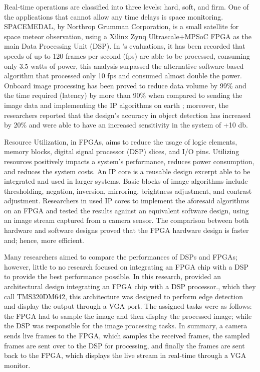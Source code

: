 \par	Real-time operations are classified into three levels: hard, soft, and firm. One of the applications that cannot allow any time delays is space monitoring. SPACEMEDAL, by Northrop Grumman Corporation, is a small satellite for space meteor observation, using a Xilinx Zynq Ultrascale+MPSoC FPGA as the main Data Processing Unit (DSP). In \cite{eleven}’s evaluations, it has been recorded that speeds of up to 120 frames per second (fps) are able to be processed, consuming only 3.5 watts of power, this analysis surpassed the alternative software-based algorithm that processed only 10 fps and consumed almost double the power. Onboard image processing has been proved to reduce data volume by 99\% and the time required (latency) by more than 90\% when compared to sending the image data and implementing the IP algorithms on earth \cite{eleven}; moreover, the researchers reported that the design’s accuracy in object detection has increased by 20\% and were able to have an increased sensitivity in the system of +10 db.   \newline
\par	Resource Utilization, in FPGAs, aims to reduce the usage of logic elements, memory blocks, digital signal processor (DSP) slices, and I/O pins. Utilizing resources positively impacts a system’s performance, reduces power consumption, and reduces the system costs. An IP core is a reusable design excerpt able to be integrated and used in larger systems. Basic blocks of image algorithms include thresholding, negation, inversion, mirroring, brightness adjustment, and contrast adjustment. Researchers in \cite{fourteen} used IP cores to implement the aforesaid algorithms on an FPGA and tested the results against an equivalent software design, using an image stream captured from a camera sensor. The comparison between both hardware and software designs proved that the FPGA hardware design is faster and; hence, more efficient. \newline
\par	Many researchers aimed to compare the performances of DSPs and FPGAs; however, little to no research focused on integrating an FPGA chip with a DSP to provide the best performance possible. In this research, \cite{nineteen} provided an architectural design integrating an FPGA chip with a DSP processor., which they call TMS320DM642, this architecture was designed to perform edge detection and display the output through a VGA port. The assigned tasks were as follows: the FPGA had to sample the image and then display the processed image; while the DSP was responsible for the image processing tasks. In summary, a camera sends live frames to the FPGA, which samples the received frames, the sampled frames are sent over to the DSP for processing, and finally the frames are sent back to the FPGA, which displays the live stream in real-time through a VGA monitor. \newline

